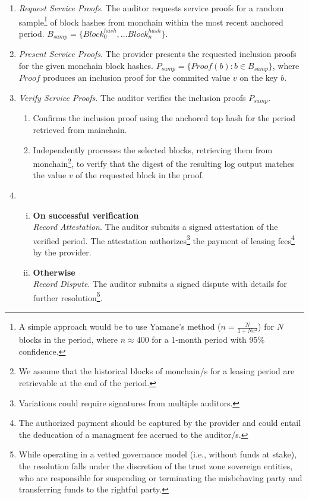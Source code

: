 \documentclass{oc}
\begin{document}
\begin{enumerate}
  \item \emph{Request Service Proofs}. The \gls{auditor} requests service proofs for a random sample\footnote{
    A simple approach would be to use Yamane's method ($n=\frac{N}{1+Ne^2}$) for $N$ blocks in the period, where $n\approx400$ for a 1-month period with 95\% confidence.
  } of block hashes from \gls{monchain} within the most recent anchored period. $B_{samp}=\{Block^{hash}_0,\ldots{Block^{hash}_n}\}$.
  
  \item \emph{Present Service Proofs}. The \gls{provider} presents the requested inclusion proofs for the given \gls{monchain} block hashes. $P_{samp}=\{Proof(b) : b \in B_{samp}\}$,
  where $Proof$ produces an inclusion proof for the commited value $v$ on the key $b$.
  
  \item \emph{Verify Service Proofs}. The \gls{auditor} verifies the inclusion proofs $P_{samp}$.
    \begin{enumerate}
      \item Confirms the inclusion proof using the anchored top hash for the period retrieved from \gls{mainchain}.
      \item Independently processes the selected blocks, retrieving them from \gls{monchain}\footnote{
        We assume that the historical blocks of \gls*{monchain}/s for a leasing period are retrievable at the end of the period.
      }, to verify that the digest of the resulting log output matches the value $v$ of the requested block in the proof.
    \end{enumerate}
  \item
    \begin{enumerate}[(i)]
      \item \textbf{On successful verification} \\
      \emph{Record Attestation}. The \gls{auditor} submits a signed attestation of the verified period. The attestation authorizes\footnote{
        Variations could require signatures from multiple auditors.
      } the payment of leasing fees\footnote{
        The authorized payment should be captured by the \gls{provider} and could entail the deducation of a managment fee accrued to the \gls{auditor}/s.
      } by the \gls{provider}.
      \item \textbf{Otherwise} \\
      \emph{Record Dispute}. The \gls{auditor} submits a signed dispute with details for further resolution\footnote{
        While operating in a vetted governance model (i.e., without funds at stake),
        the resolution falls under the discretion of the trust zone sovereign entities,
        who are responsible for suspending or terminating the misbehaving party and transferring funds to the rightful party.
      }.
    \end{enumerate}

\end{enumerate}
\end{document}

